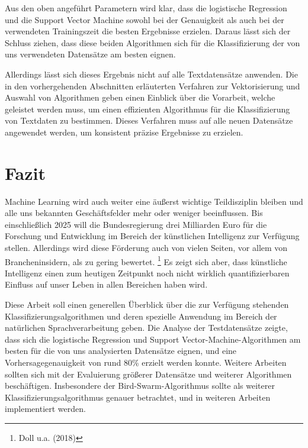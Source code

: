 \documentclass[a4paper,12pt]{article}
\begin{document}
Aus den oben angeführt Parametern wird klar, dass die logistische Regression und die Support Vector Machine sowohl bei der Genauigkeit als auch bei der verwendeten Trainingszeit die besten Ergebnisse erzielen. Daraus lässt sich der Schluss ziehen, dass diese beiden Algorithmen sich für die Klassifizierung der von uns verwendeten Datensätze am besten eignen. 

Allerdings lässt sich dieses Ergebnis nicht auf alle Textdatensätze anwenden. Die in den vorhergehenden Abschnitten erläuterten Verfahren zur Vektorisierung und Auswahl von Algorithmen geben einen Einblick über die Vorarbeit, welche geleistet werden muss, um einen effizienten Algorithmus für die Klassifizierung von Textdaten zu bestimmen. Dieses Verfahren muss auf alle neuen Datensätze angewendet werden, um konsistent präzise Ergebnisse zu erzielen. 


\section{Fazit}
Machine Learning wird auch weiter eine äußerst wichtige Teildisziplin bleiben und alle uns bekannten Geschäftsfelder mehr oder weniger beeinflussen. Bis einschließlich 2025 will die Bundesregierung drei Milliarden Euro für die Forschung und Entwicklung im Bereich der künstlichen Intelligenz zur Verfügung stellen. Allerdings wird diese Förderung auch von vielen Seiten, vor allem von Brancheninsidern, als zu gering bewertet. \footnote{Doll u.a. (2018)} Es zeigt sich aber, dass künstliche Intelligenz einen zum heutigen Zeitpunkt noch nicht wirklich quantifizierbaren Einfluss auf unser Leben in allen Bereichen haben wird. 

Diese Arbeit soll einen generellen Überblick über die zur Verfügung stehenden Klassifizierungsalgorithmen und deren spezielle Anwendung im Bereich der natürlichen Sprachverarbeitung geben. Die Analyse der Testdatensätze zeigte, dass sich die logistische Regression und Support Vector-Machine-Algorithmen am besten für die von uns analysierten Datensätze eignen, und eine Vorhersagegenauigkeit von rund 80\% erzielt werden konnte. 
Weitere Arbeiten sollten sich mit der Evaluierung größerer Datensätze und weiterer Algorithmen beschäftigen. Insbesondere der Bird-Swarm-Algorithmus sollte als weiterer Klassifizierungsalgorithmus genauer betrachtet, und in weiteren Arbeiten implementiert werden. 
\end{document}

